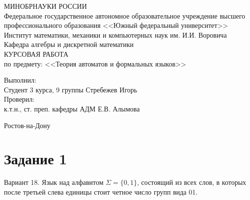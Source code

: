 \documentclass[fleqn,12pt, a4paper]{article}
\begin{document}

\begin{titlepage}

\begin{center}
\MakeUppercase{Минобрнауки России}\\
Федеральное государственное автономное образовательное учреждение
высшего профессионального образования
<<Южный федеральный университет>>\\[1 cm]

Институт математики, механики и компьютерных наук им. И.И. Воровича\\[1 cm]

Кафедра алгебры и дискретной математики\\[5cm]

\Huge \MakeUppercase{Курсовая работа} \\[0.6cm]

\large по предмету: <<Теория автоматов и формальных языков>>\\[7cm]

\end{center}

\begin{flushleft}
{\large
Выполнил: \\
Студент 3 курса, 9 группы \hfill Стребежев Игорь \\[1cm]

Проверил:\\
к.т.н., ст. преп. кафедры АДМ \hfill Е.В. Алымова}

\end{flushleft}
\vfill

\begin{center}
Ростов-на-Дону\\
\the\year
\end{center}
\end{titlepage}


\section*{Задание 1}

Вариант 18. Язык над алфавитом $\Sigma = \{ 0, 1 \} $, состоящий из всех слов, в которых после третьей слева единицы стоит четное число групп вида 01.
\end{document}
